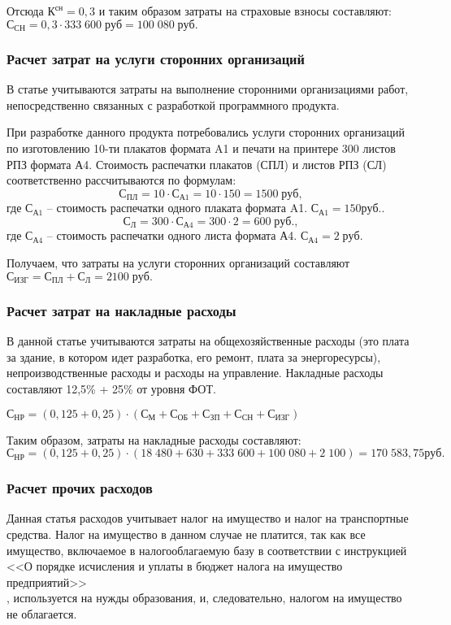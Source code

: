 Отсюда  $К^{сн} = 0,3$  и таким образом затраты на страховые взносы составляют: $С_{СН} = 0,3  \cdot 333 \; 600  \; руб = 100 \; 080 \; руб.$

\subsubsection{Расчет затрат на услуги сторонних организаций} 

В статье учитываются затраты на выполнение сторонними организациями работ, непосредственно связанных с разработкой программного продукта.

При разработке данного продукта потребовались услуги сторонних организаций по изготовлению 10-ти плакатов формата A1 и печати на принтере 300 листов РПЗ формата А4.  Стоимость распечатки плакатов  (СПЛ) и листов РПЗ (СЛ) соответственно  рассчитываются  по формулам:
$$С_{ПЛ} =10 \cdot С_{А1} = 10 \cdot 150 = 1500 \; руб,$$
где $С_{А1}$ – стоимость распечатки одного плаката формата A1.   $С_{А1}  = 150 руб.$.
$$С_Л =300 \cdot С_{А4} = 300 \cdot 2 = 600 \; руб.,$$
где $С_{А4}$ – стоимость распечатки одного листа  формата А4. $С_{А4}  = 2 \; руб.$

Получаем, что затраты на услуги сторонних организаций составляют
$С_{ИЗГ}= С_{ПЛ} + С_Л = 2100 \; руб.$

\subsubsection{Расчет затрат на накладные расходы}
В данной статье учитываются затраты на общехозяйственные расходы (это плата за здание, в котором идет разработка, его ремонт, плата за энергоресурсы), непроизводственные расходы и расходы на управление.
Накладные расходы составляют 12,5\% + 25\% от уровня ФОТ.
 
$С_{НР}  =(0,125+0,25) \cdot (С_М + С_{ОБ} + С_{ЗП} + С_{СН} + С_{ИЗГ})$

Таким образом,  затраты на накладные расходы составляют:  
$С_{НР}  = (0,125+0,25) \cdot (18 \; 480+ 630 + 333 \; 600+ 100 \; 080 + 2 \; 100) =170 \; 583,75 руб.$

\subsubsection{Расчет прочих расходов}

Данная статья расходов учитывает налог на имущество и налог на транспортные средства. Налог на имущество в данном случае не платится, так как  все имущество, включаемое в налогооблагаемую базу в соответствии с инструкцией <<О порядке исчисления и уплаты в бюджет налога на имущество предприятий>>\\
, используется на нужды образования, и, следовательно, налогом на имущество не облагается.


